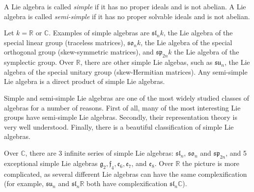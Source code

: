 \documentclass[12pt]{article}
\newcommand{\fr}[1]{\mathfrak{#1}}
\def\C{\mathbb{C}}
\def\R{\mathbb{R}}
\begin{document}

A Lie algebra is called {\em simple} if it has no proper ideals and is not abelian. A Lie algebra
is called {\em semi-simple} if it has no proper solvable ideals and is not abelian.

Let $k=\R$ or $\C$. Examples of simple algebras are $\fr{sl}_nk$, the Lie algebra
of the special linear group (traceless matrices), $\fr{so}_nk$, the Lie algebra of the special
orthogonal group (skew-symmetric matrices), and $\fr{sp}_{2n} k$ the Lie algebra of the symplectic group. Over $\R$, there are other simple Lie algebas, such as $\fr{su}_n$, the Lie algebra of the special unitary group
(skew-Hermitian matrices). Any
semi-simple Lie algebra is a direct product of simple Lie algebras.

Simple and semi-simple Lie algebras are one of the most widely studied classes of algebras
for a number of reasons. First of all, many of the most interesting Lie groups have semi-simple
Lie algebras. Secondly, their representation theory is very well understood. Finally, there is
a beautiful classification of simple Lie algebras.

Over $\C$, there are 3 infinite series of simple Lie algebras: $\fr{sl}_n$, $\fr {so}_n$ and
$\fr{sp}_{2n}$, and 5 exceptional simple Lie algebras $\fr g_2,\fr f_4,\fr e_6,\fr e_7$, and $\fr e_8$.
Over $\R$ the picture is more complicated, as several different Lie algebras can have the same complexification (for example, $\fr{su}_n$ and $\fr{sl}_n\R$ both have complexification $\fr{sl}_n\C$).
\end{document}
